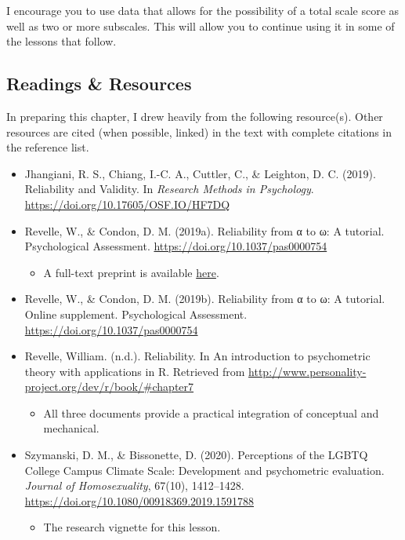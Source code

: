 \documentclass[
  english,
]{book}
\providecommand{\tightlist}{%
  \setlength{\itemsep}{0pt}\setlength{\parskip}{0pt}}
\begin{document}
I encourage you to use data that allows for the possibility of a total scale score as well as two or more subscales. This will allow you to continue using it in some of the lessons that follow.

\hypertarget{readings-resources-3}{%
\subsection{Readings \& Resources}\label{readings-resources-3}}

In preparing this chapter, I drew heavily from the following resource(s). Other resources are cited (when possible, linked) in the text with complete citations in the reference list.

\begin{itemize}
\tightlist
\item
  Jhangiani, R. S., Chiang, I.-C. A., Cuttler, C., \& Leighton, D. C. (2019). Reliability and Validity. In \emph{Research Methods in Psychology}. \url{https://doi.org/10.17605/OSF.IO/HF7DQ}
\item
  Revelle, W., \& Condon, D. M. (2019a). Reliability from α to ω: A tutorial. Psychological Assessment. \url{https://doi.org/10.1037/pas0000754}

  \begin{itemize}
  \tightlist
  \item
    A full-text preprint is available \href{https://personality-project.org/revelle/publications/rc.pa.19.pdf}{here}.
  \end{itemize}
\item
  Revelle, W., \& Condon, D. M. (2019b). Reliability from α to ω: A tutorial. Online supplement. Psychological Assessment. \url{https://doi.org/10.1037/pas0000754}
\item
  Revelle, William. (n.d.). Reliability. In An introduction to psychometric theory with applications in R. Retrieved from \url{http://www.personality-project.org/dev/r/book/\#chapter7}

  \begin{itemize}
  \tightlist
  \item
    All three documents provide a practical integration of conceptual and mechanical.
  \end{itemize}
\item
  Szymanski, D. M., \& Bissonette, D. (2020). Perceptions of the LGBTQ College Campus Climate Scale: Development and psychometric evaluation. \emph{Journal of Homosexuality}, 67(10), 1412--1428. \url{https://doi.org/10.1080/00918369.2019.1591788}

  \begin{itemize}
  \tightlist
  \item
    The research vignette for this lesson.
  \end{itemize}
\end{itemize}
\end{document}
